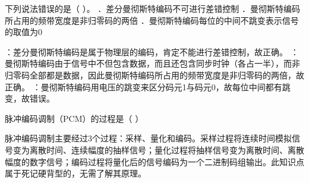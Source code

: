 \question 下列说法错误的是（ ）。 ．差分曼彻斯特编码不可进行差错控制
．曼彻斯特编码所占用的频带宽度是非归零码的两倍
．曼彻斯特编码每位的中间不跳变表示信号的取值为0
\par{}
\begin{solution}：差分曼彻斯特编码是属于物理层的编码，肯定不能进行差错控制，故正确。
：曼彻斯特编码由于信号中不但包含数据，而且还包含同步时钟（各占一半），而非归零码全部都是数据，因此曼彻斯特编码所占用的频带宽度是非归零码的两倍，故正确。
：曼彻斯特编码用电压的跳变来区分码元1与码元0，故每位中间都有跳变，故错误。
\end{solution}
\question 脉冲编码调制（PCM）的过程是（ ）
\par{}
\begin{solution}脉冲编码调制主要经过3个过程：采样、量化和编码。采样过程将连续时间模拟信号变为离散时间、连续幅度的抽样信号；量化过程将抽样信号变为离散时间、离散幅度的数字信号；编码过程将量化后的信号编码为一个二进制码组输出。此知识点属于死记硬背型的，无需了解其原理。
\end{solution}
